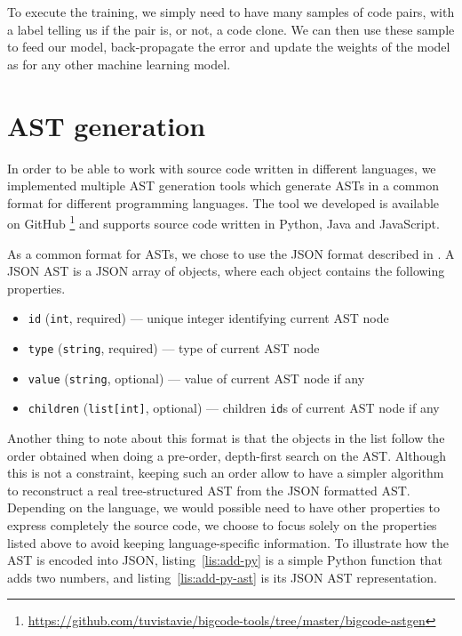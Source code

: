 To execute the training, we simply need to have many samples of code pairs,
with a label telling us if the pair is, or not, a code clone. We can then use
these sample to feed our model, back-propagate the error and update the weights
of the model as for any other machine learning model.
\section{\label{sec:ast-generation}AST generation}
In order to be able to work with source code written in different languages,
we implemented multiple AST generation tools which generate ASTs in a common
format for different programming languages. The tool we developed is available
on GitHub%
\footnote{\url{https://github.com/tuvistavie/bigcode-tools/tree/master/bigcode-astgen}}
and supports source code written in Python, Java and JavaScript.

As a common format for ASTs, we chose to use the JSON format described in
\cite{Raychev:2016:LPN:2837614.2837671}. A JSON AST is a JSON array of objects,
where each object contains the following properties.

\begin{itemize}
\item \lstinline{id} (\lstinline{int}, required) ---  unique integer identifying
  current AST node
\item \lstinline{type} (\lstinline{string}, required) --- type of current AST node
\item \lstinline{value} (\lstinline{string}, optional) --- value of current AST
  node if any
\item \lstinline{children} (\lstinline{list[int]}, optional) --- children
  \lstinline{id}s of current AST node if any
\end{itemize}
%
Another thing to note about this format is that the objects in the list follow
the order obtained when doing a pre-order, depth-first search on the AST.
Although this is not a constraint, keeping such an order allow to have a simpler
algorithm to reconstruct a real tree-structured AST from the JSON formatted AST.
Depending on the language, we would possible need to have other
properties to express completely the source code, we choose to focus solely on
the properties listed above to avoid keeping language-specific information. To
illustrate how the AST is encoded into JSON, listing~\ref{lis:add-py} is a
simple Python function that adds two numbers, and listing~\ref{lis:add-py-ast}
is its JSON AST representation.

